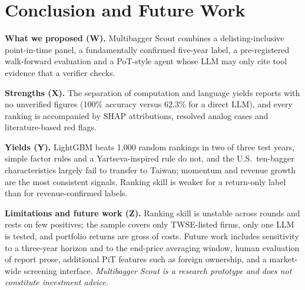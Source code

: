 \documentclass[conference]{IEEEtran}
\begin{document}
\section{Conclusion and Future Work}
\label{sec:conclusion}

\textbf{What we proposed (W).} Multibagger Scout combines a delisting-inclusive point-in-time panel, a fundamentally confirmed five-year label, a pre-registered walk-forward evaluation and a PoT-style agent whose LLM may only cite tool evidence that a verifier checks.

\textbf{Strengths (X).} The separation of computation and language yields reports with no unverified figures (100\% accuracy versus 62.3\% for a direct LLM), and every ranking is accompanied by SHAP attributions, resolved analog cases and literature-based red flags.

\textbf{Yields (Y).} LightGBM beats 1,000 random rankings in two of three test years, simple factor rules and a Yartseva-inspired rule do not, and the U.S.\ ten-bagger characteristics largely fail to transfer to Taiwan; momentum and revenue growth are the most consistent signals. Ranking skill is weaker for a return-only label than for revenue-confirmed labels.

\textbf{Limitations and future work (Z).} Ranking skill is unstable across rounds and rests on few positives; the sample covers only TWSE-listed firms, only one LLM is tested, and portfolio returns are gross of costs. Future work includes sensitivity to a three-year horizon and to the end-price averaging window, human evaluation of report prose, additional PiT features such as foreign ownership, and a market-wide screening interface. \emph{Multibagger Scout is a research prototype and does not constitute investment advice.}
\end{document}
